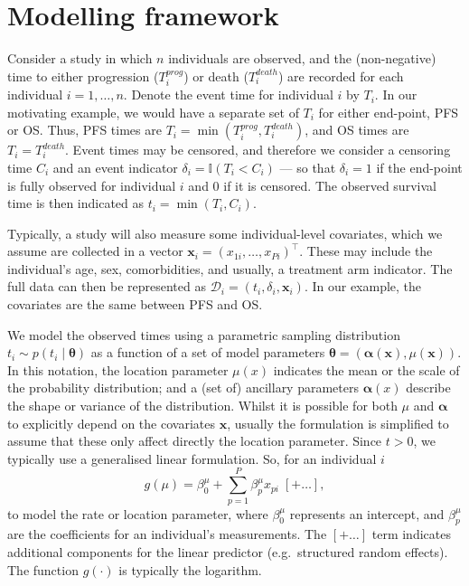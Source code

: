 \documentclass[AMA,STIX1COL]{WileyNJD-v2}
\begin{document}
%
\section{Modelling framework}\label{sec:methods}
Consider a study in which $n$ individuals are observed, and the (non-negative) time to either progression ($T^{prog}_{i}$) or death ($T^{death}_{i}$) are recorded for each individual $i=1,\ldots,n$.
Denote the event time for individual $i$ by $T_{i}$.
In our motivating example, we would have a separate set of $T_{i}$ for either end-point, PFS or OS.
Thus, PFS times are $T_{i} = \min(T^{prog}_{i}, T^{death}_{i})$, and OS times are $T_{i} = T^{death}_{i}$.
Event times may be censored, and therefore we consider a censoring time $C_{i}$ and an event indicator $\delta_{i} = \mathbb{I}(T_{i} < C_{i})$
--- so that $\delta_{i} = 1$ if the end-point is fully observed for individual $i$ and 0 if it is censored.
The observed survival time is then indicated as $t_{i} = \min(T_{i}, C_{i})$.

Typically, a study will also measure some individual-level covariates, which we assume are collected in a vector $\bm{x}_{i} = (x_{1i}, \ldots, x_{Pi})^\top$.
These may include the individual's age, sex, comorbidities, and usually, a treatment arm indicator.
The full data can then be represented as
$\mathcal{D}_i = (t_i, \delta_i, \bm{x}_i)$.
In our example, the covariates are the same between PFS and OS.

We model the observed times using a parametric sampling distribution $t_{i} \sim p(t_{i} \mid \bm\theta)$ as a function of a set of model parameters $\bm\theta = (\bm\alpha(\bm x), \mu(\bm x))$. 
In this notation, the location parameter $\mu(x)$ indicates the mean or the scale of the probability distribution; and a (set of) ancillary parameters $\bm \alpha(x)$ describe the shape or variance of the distribution.
Whilst it is possible for both $\mu$ and $\bm\alpha$ to explicitly depend on the covariates $\bm x$, usually the formulation is simplified to assume that these only affect directly the location parameter.
Since $t>0$, we typically use a generalised linear formulation.
So, for an individual $i$
$$
g(\mu) = \beta^{\mu}_{0} + \sum_{p=1}^P \beta^{\mu}_{p} x_{pi} \; [+ \ldots ],
$$
to model the rate or location parameter,
where $\beta^{\mu}_{0}$ represents an intercept,
and $\beta^{\mu}_{p}$ are the coefficients for an individual's measurements.
The $[+ \ldots]$ term indicates additional components for the linear predictor (e.g.~structured random effects).
The function $g(\cdot)$ is typically the logarithm.
\end{document}
